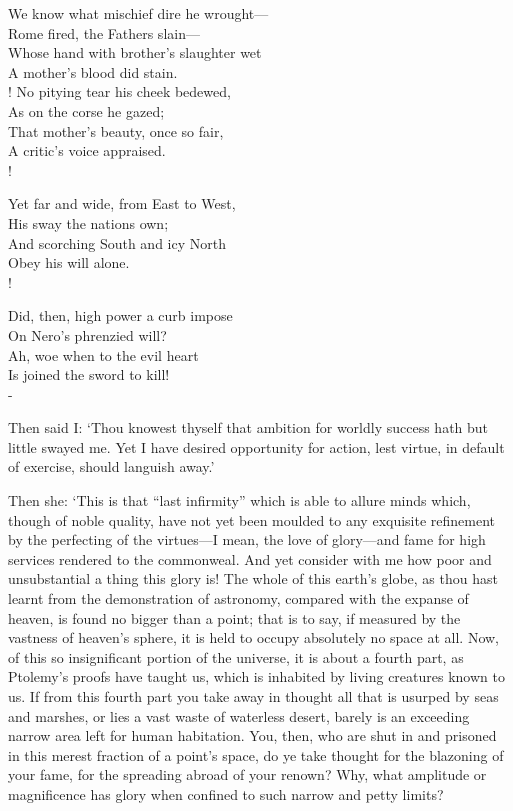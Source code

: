 \documentclass[11pt]{book}
\newenvironment{vpoem}[1]%
  {%
    \centerpoemon{Down their cheeks unfeigned the tear drops}
    \def\poemvsindentlines{#1}\begin{poem}\footnotesize%
  }%
  {%
    \end{poem}\def\poemvsindentlines{\relax}%
    \centerpoemoff
  }
\begin{document}
\begin{vpoem}{24}
    We know what mischief dire he wrought--- \\
      Rome fired, the Fathers slain--- \\
    Whose hand with brother's slaughter wet \\
      A mother's blood did stain. \\!
\newpage
    No pitying tear his cheek bedewed, \\
      As on the corse he gazed; \\
    That mother's beauty, once so fair, \\
      A critic's voice appraised. \\!

    Yet far and wide, from East to West, \\
      His sway the nations own; \\
    And scorching South and icy North \\
      Obey his will alone. \\!

    Did, then, high power a curb impose \\
      On Nero's phrenzied will? \\
    Ah, woe when to the evil heart \\
      Is joined the sword to kill! \\-
\end{vpoem}


Then said I: `Thou knowest thyself that ambition for worldly success
hath but little swayed me. Yet I have desired opportunity for action,
lest virtue, in default of exercise, should languish away.'

Then she: `This is that ``last infirmity'' which is able to allure minds
which, though of noble quality, have not yet been moulded to any
exquisite refinement by the perfecting of the virtues---I mean, the love
of glory---and fame for high services rendered to the commonweal. And yet
consider with me how poor and unsubstantial a thing this glory is! The
whole of this earth's globe, as thou hast learnt from the demonstration
of astronomy, compared with the expanse of heaven, is found no bigger
than a point; that is to say, if measured by the vastness of heaven's
sphere, it is held to occupy absolutely no space at all. Now, of this so
insignificant portion of the universe, it is about a fourth part, as
Ptolemy's proofs have taught us, which is inhabited by living creatures
known to us. If from this fourth part you take away in thought all that
is usurped by seas and marshes, or lies a vast waste of waterless
desert, barely is an exceeding narrow area left for human habitation.
You, then, who are shut in and prisoned in this merest fraction of a
point's space, do ye take thought for the blazoning of your fame, for
the spreading abroad of your renown? Why, what amplitude or magnificence
has glory when confined to such narrow and petty limits?
\end{document}
